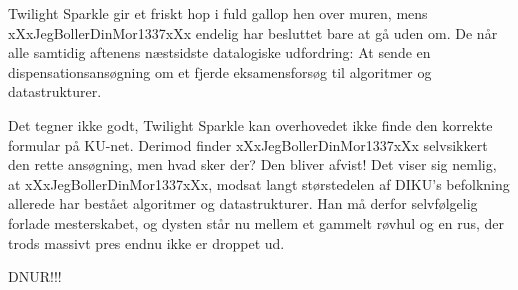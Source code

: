 \documentclass[a4paper,11pt]{article}
\begin{document}
\begin{sketch}
 Twilight Sparkle gir et friskt hop i fuld gallop hen over muren, mens xXxJegBollerDinMor1337xXx endelig har besluttet bare at gå uden om. De når alle samtidig aftenens næstsidste datalogiske udfordring: At sende en dispensationsansøgning om et fjerde eksamensforsøg til algoritmer og datastrukturer.






 Det tegner ikke godt, Twilight Sparkle kan overhovedet ikke finde den korrekte formular på KU-net. Derimod finder xXxJegBollerDinMor1337xXx selvsikkert den rette ansøgning, men hvad sker der? Den bliver afvist! Det viser sig nemlig, at xXxJegBollerDinMor1337xXx, modsat langt størstedelen af DIKU's befolkning allerede har bestået algoritmer og datastrukturer. Han må derfor selvfølgelig forlade mesterskabet, og dysten står nu mellem et gammelt røvhul og en rus, der trods massivt pres endnu ikke er droppet ud.


   DNUR!!!


\end{sketch}
\end{document}
